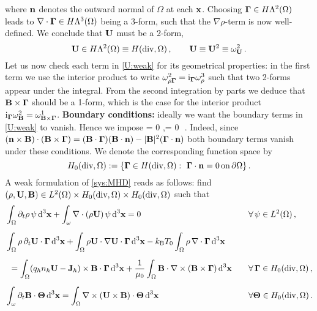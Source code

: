 \documentclass[11pt]{amsart}
\begin{document}
where $\mathbf{n}$ denotes the outward normal of $\Omega$ at each $\mathbf{x}$. Choosing $\boldsymbol{\Gamma} \in 
H\Lambda^2(\Omega)$ leads to ${\nabla \cdot \boldsymbol{\Gamma} \in H\Lambda^3(\Omega)}$ being a 3-form, such 
that the $\nabla \rho$-term is now well-defined. We conclude that $\mathbf{U}$ must be a 2-form,
$$
  \mathbf{U} \in H \Lambda^2(\Omega) \equiv H(\textnormal{div},\Omega)\,,\qquad \mathbf{U} \equiv \mathbf{U}^2 \equiv \omega^2_{\mathbf{U}}\,.
$$
Let us now check each term in \eqref{U:weak} for its geometrical properties: in the first term we 
use the interior product to write $\omega^2_{\rho\boldsymbol{\Gamma}} = \textnormal i_{\boldsymbol{\Gamma}} \omega^3_{\rho}$ such that 
two 
2-forms appear under the integral. 
From the second integration by parts we deduce 
that $\mathbf{B}\times \boldsymbol{\Gamma}$ should be a 1-form, which is the case for the interior product $\textnormal 
i_{\boldsymbol{\Gamma}} \omega^2_{\mathbf{B}} = \omega^1_{\mathbf{B} \times \boldsymbol{\Gamma}}$. 
{\bf Boundary conditions:} ideally we want the boundary terms in \eqref{U:weak} to vanish. Hence we 
impose 
\be \label{bcs}
 \Ub \cdot \nb = 0\quad {}\,\pa\Omega\,,\qquad\quad \Bb \cdot \nb = 0 \quad 
{}\,\pa\Omega\,.
\ee
Indeed, since $(\mathbf{n} \times \mathbf{B}) \cdot (\mathbf{B} \times \boldsymbol{\Gamma}) = (\mathbf{B} \cdot \boldsymbol{\Gamma})(\mathbf{B} \cdot \mathbf{n}) - 
|\mathbf{B}|^2 (\boldsymbol{\Gamma} \cdot \mathbf{n})$ both boundary terms vanish under these conditions. We denote the 
corresponding function space by
$$
 H_0(\textnormal{div},\Omega) := \{ \boldsymbol{\Gamma} \in H(\textnormal{div},\Omega) :\,\, \boldsymbol{\Gamma} \cdot \mathbf{n} = 0\,\textnormal{on}\,\partial\Omega \}\,.
$$
A weak formulation of \eqref{sys:MHD} reads as follows: find ${(\rho,\mathbf{U},\mathbf{B}) \in 
L^2(\Omega) \times H_0(\textnormal{div},\Omega) \times H_0(\textnormal{div},\Omega)}$ such that
\begin{subequations} \label{sys:MHD:weak}
\begin{align}
& \int_\Omega \partial_t \rho\,\psi\,\textnormal d^3 \mathbf{x} + \int_\omega \nabla \cdot (\rho \mathbf{U})\,\psi\, \textnormal 
d^3\mathbf{x} = 0 \quad && \forall\,\psi \in L^2(\Omega)\,, \label{eq:rho2w}
 \\[2mm]
 &\int_\Omega \rho\, \partial_t \mathbf{U} \cdot \boldsymbol{\Gamma}\,\textnormal d^3\mathbf{x} + \int_\Omega \rho\mathbf{U} \cdot \nabla \mathbf{U} \cdot 
\boldsymbol{\Gamma}\, \textnormal d^3\mathbf{x} - k_\textnormal{B}T_0 \int_\Omega \rho\,\nabla \cdot \boldsymbol{\Gamma}\, \textnormal d^3 \mathbf{x}  
\nonumber
 \\[2mm]
 &\:\: = \int_\Omega (q_h n_h \mathbf{U} - \mathbf{J}_h) \times \mathbf{B} \cdot \boldsymbol{\Gamma}\, \textnormal d^3\mathbf{x} + 
\frac{1}{\mu_0} \int_\Omega  \mathbf{B} \cdot \nabla \times (\mathbf{B} \times \boldsymbol{\Gamma})\, \textnormal d^3 \mathbf{x} \quad && 
\forall\, \boldsymbol{\Gamma} \in H_0(\textnormal{div},\Omega)\,,  \label{eq:U2w}
 \\[2mm]
 & \int_\omega \partial_t \mathbf{B} \cdot \boldsymbol{\Theta}\, \textnormal d^3\mathbf{x} = \int_\Omega \nabla \times (\mathbf{U} \times \mathbf{B}) 
\cdot \boldsymbol{\Theta}\,\textnormal d^3\mathbf{x} \quad && \forall \boldsymbol{\Theta} \in H_0(\textnormal{div},\Omega)\,.  \label{eq:B2w}
\end{align}
\end{subequations}
\end{document}
